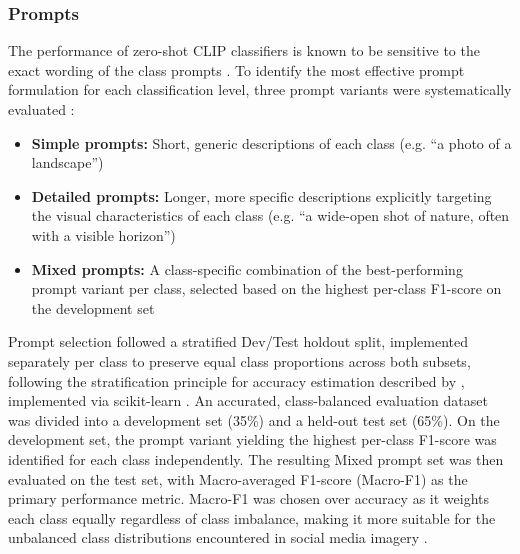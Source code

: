 \documentclass[hidelinks, 11pt]{article}
\begin{document}
\subsubsection{Prompts}
The performance of zero-shot CLIP classifiers is known to be sensitive to the exact wording of the class prompts \citep{yong_prompt_2023, malla_enhancing_2025, liao_mapping_2025}. To identify the most effective prompt formulation for each classification level, three prompt variants were systematically evaluated \citep{ liao_mapping_2025}:
\begin{itemize}
\item \textbf{Simple prompts:} Short, generic descriptions of each class (e.g. ``a photo of a landscape'')
\item \textbf{Detailed prompts:} Longer, more specific descriptions explicitly targeting the visual characteristics of each class (e.g. ``a wide-open shot of nature, often with a visible horizon'')
\item \textbf{Mixed prompts:} A class-specific combination of the best-performing prompt variant per class, selected based on the highest per-class F1-score on the development set
\end{itemize}
Prompt selection followed a stratified Dev/Test holdout split, implemented separately per class to preserve equal class proportions across both subsets, following the stratification principle for accuracy estimation
described by \citet{kohavi_study_1995}, implemented via scikit-learn \citep{pedregosa_scikit-learn_2011}. An accurated, class-balanced evaluation dataset was divided into a development set (35\%) and a held-out test set (65\%). On the development set, the prompt variant yielding the highest per-class F1-score was identified for each class independently. The resulting Mixed prompt set was then evaluated on the test set, with Macro-averaged F1-score (Macro-F1) as the primary performance metric. Macro-F1 was chosen over accuracy as it weights each class equally regardless of class imbalance, making it more suitable for the unbalanced
class distributions encountered in social media imagery
\citep{liao_mapping_2025, sokolova_systematic_2009}.
\end{document}

